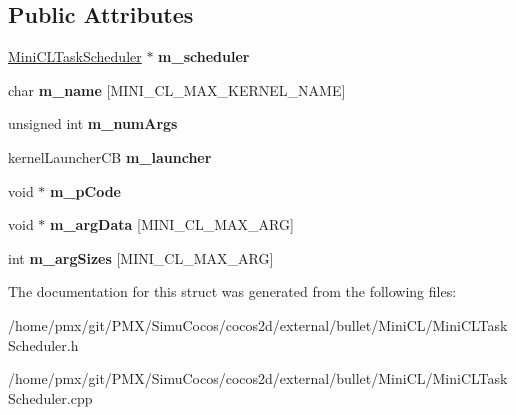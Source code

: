\subsection*{Public Attributes}
\begin{DoxyCompactItemize}
\item 
\mbox{\label{structMiniCLKernel_a53f9f290d807e19e85a913f848a3b0e2}} 
\hyperlink{classMiniCLTaskScheduler}{Mini\+C\+L\+Task\+Scheduler} $\ast$ {\bfseries m\+\_\+scheduler}
\item 
\mbox{\label{structMiniCLKernel_ae7633a1799419ef20eed8e1ccc7a0e07}} 
char {\bfseries m\+\_\+name} \mbox{[}M\+I\+N\+I\+\_\+\+C\+L\+\_\+\+M\+A\+X\+\_\+\+K\+E\+R\+N\+E\+L\+\_\+\+N\+A\+ME\mbox{]}
\item 
\mbox{\label{structMiniCLKernel_abdcd66ae9066265f9409a74ab549fe2d}} 
unsigned int {\bfseries m\+\_\+num\+Args}
\item 
\mbox{\label{structMiniCLKernel_aa7162b26a29f94f5abfaa5aa1d079478}} 
kernel\+Launcher\+CB {\bfseries m\+\_\+launcher}
\item 
\mbox{\label{structMiniCLKernel_a876b9fe0e7e2c3fc0a2322b537cecf7a}} 
void $\ast$ {\bfseries m\+\_\+p\+Code}
\item 
\mbox{\label{structMiniCLKernel_a4ffd64dcce287d9e5b84f46aba194ba5}} 
void $\ast$ {\bfseries m\+\_\+arg\+Data} \mbox{[}M\+I\+N\+I\+\_\+\+C\+L\+\_\+\+M\+A\+X\+\_\+\+A\+RG\mbox{]}
\item 
\mbox{\label{structMiniCLKernel_a59e6329b507f03b2fc6f4d6a0028026c}} 
int {\bfseries m\+\_\+arg\+Sizes} \mbox{[}M\+I\+N\+I\+\_\+\+C\+L\+\_\+\+M\+A\+X\+\_\+\+A\+RG\mbox{]}
\end{DoxyCompactItemize}


The documentation for this struct was generated from the following files\+:\begin{DoxyCompactItemize}
\item 
/home/pmx/git/\+P\+M\+X/\+Simu\+Cocos/cocos2d/external/bullet/\+Mini\+C\+L/Mini\+C\+L\+Task\+Scheduler.\+h\item 
/home/pmx/git/\+P\+M\+X/\+Simu\+Cocos/cocos2d/external/bullet/\+Mini\+C\+L/Mini\+C\+L\+Task\+Scheduler.\+cpp\end{DoxyCompactItemize}
